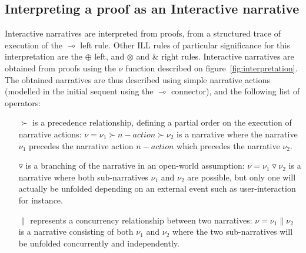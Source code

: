 \documentclass[runningheads,a4paper]{llncs}
\begin{document}
\subsection{Interpreting a proof as an Interactive narrative\label{subsec:proof_to_narrative}}
Interactive narratives are interpreted from proofs, from a structured trace of execution of the $\multimap$ left rule. Other ILL rules of particular significance for this interpretation are the $\oplus$ left, and $\otimes$ and $\&$ right rules. Interactive narratives are obtained from proofs using the $\nu$ function described on figure~\ref{fig:interpretation}. The obtained narratives are thus described using simple narrative actions (modelled in the initial sequent using the $\multimap$ connector), and the following list of operators:
\begin{itemize}
\item [$\succ$] is a precedence relationship, defining a partial order on the execution of narrative actions: $\nu=\nu_1\succ n-action \succ \nu_2$ is a narrative where the narrative $\nu_1$ precedes the narrative action $n-action$ which precedes the narrative $\nu_2$.
\item [$\triangledown$] is a branching of the narrative in an open-world assumption: $\nu=\nu_1\triangledown\nu_2$ is a narrative where both sub-narratives $\nu_1$ and $\nu_2$ are possible, but only one will actually be unfolded depending on an external event such as user-interaction for instance.
\item [$\|$] represents a concurrency relationship between two narratives: $\nu=\nu_1\|\nu_2$ is a narrative consisting of both $\nu_1$ and $\nu_2$ where the two sub-narratives will be unfolded concurrently and independently.
\end{itemize}
\end{document}
